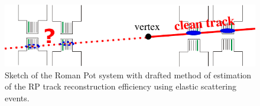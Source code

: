 \begin{figure}[h]%
	\centering
	\parbox{0.65\textwidth}{%
		\centering%
		\includegraphics[width=\linewidth]{graphics/systematicsEfficiency/RpSyst/effCalculationScheme.pdf}%
	} 
	\quad
	\parbox{0.31\textwidth}{ 
		\centering
			\caption[Draft of the method of estimation of the RP track reconstruction efficiency for systematic uncertainty determination.]%
			{Sketch of the Roman Pot system with drafted method of estimation of the RP track reconstruction efficiency using elastic scattering events.}\label{fig:sketchRpTrackEffSyst}%
	}
	
\end{figure}

